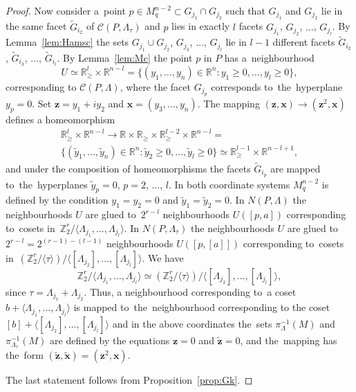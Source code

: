\documentclass[12pt]{amsart}
\theoremstyle{definition}
\theoremstyle{remark}
\begin{document}
\begin{proof}
Now consider a~point  $p\in M_q^{n-2}\subset G_{j_1}\cap G_{j_2}$ such that $G_{j_1}$ and $G_{j_2}$
lie in the same facet $\widetilde{G}_{i_2}$  of $\mathcal{C}(P,\Lambda_\tau)$ and $p$ lies in exactly 
$l$ facets $G_{j_1}$, $G_{j_2}$, $\dots$, $G_{j_l}$. By Lemma~\ref{lem:Hamsc} the sets $G_{j_1}\cup G_{j_2}$,
$G_{j_3}$, $\dots$, $G_{j_l}$ lie in $l-1$ different facets $\widetilde{G}_{i_2}$, $\widetilde{G}_{i_3}$, 
$\dots$, $\widetilde{G}_{i_l}$. By Lemma~\ref{lem:Mc} the point $p$ in $P$ has a~neighbourhood 
$$
U\simeq\mathbb R^l_{\geqslant }\times\mathbb R^{n-l}=\{(y_1,\dots,y_n)\in\mathbb R^n\colon y_1\geqslant 0,\dots,y_l\geqslant 0\},
$$ 
corresponding to $\mathcal{C}(P,\Lambda)$, where the facet $G_{j_p}$
corresponds to~the~hyperplane $y_p=0$. Set $\boldsymbol{z}=y_1+i y_2$ and
$\boldsymbol{x}=(y_3,\dots, y_n)$. The mapping $(\boldsymbol{z}, \boldsymbol{x})\to (\boldsymbol{z}^2, \boldsymbol{x})$
defines a homeomorphism 
\begin{gather*}
\mathbb R^l_{\geqslant }\times\mathbb R^{n-l}\to\mathbb R\times \mathbb R_{\geqslant}\times 
\mathbb R^{l-2}_{\geqslant}\times\mathbb R^{n-l}=\\
\{(\widetilde{y}_1,\dots,\widetilde{y}_n)
\in\mathbb R^n\colon \widetilde{y}_2\geqslant 0,\dots,\widetilde{y}_l\geqslant 0\}
\simeq \mathbb R^{l-1}_{\geqslant}\times\mathbb R^{n-l+1},
\end{gather*}
and under the composition of homeomorphisms the facets $\widetilde{G}_{i_p}$ are mapped \linebreak to~the~hyperplanes
$\widetilde{y}_p=0$, $p=2$, $\dots$, $l$. In both coordinate systems $M_q^{n-2}$ is defined by the condition  
$y_1=y_2=0$ and  $\widetilde{y}_1=\widetilde{y}_2=0$.
In $N(P,\Lambda)$ the neighbourhoods $U$ are glued to~$2^{r-l}$ neighbourhoods $U([p,a])$ corresponding 
to~cosets in~$\mathbb Z_2^r/\langle \Lambda_{j_1},\dots,\Lambda_{j_l}\rangle$. 
In $N(P,\Lambda_\tau)$ the neighbourhoods $U$  are glued to~$2^{r-l}=2^{(r-1)-(l-1)}$ neighbourhoods $U([p,[a]])$ 
corresponding to~cosets in~$(\mathbb Z_2^r/\langle\tau\rangle)/\langle [\Lambda_{j_2}],\dots,[\Lambda_{j_l}]\rangle$.
We have 
$$
\mathbb Z_2^r/\langle \Lambda_{j_1},\dots,\Lambda_{j_l}\rangle\simeq 
(\mathbb Z_2^r/\langle\tau\rangle)/\langle [\Lambda_{j_2}],\dots,[\Lambda_{j_l}]\rangle,
$$
since $\tau=\Lambda_{j_1}+\Lambda_{j_2}$.
Thus, a neighbourhood corresponding to~a coset $b+\langle \Lambda_{j_1},\dots,\Lambda_{j_l}\rangle$ 
is mapped to~the~neighbourhood corresponding to the coset 
$[b]+\langle [\Lambda_{j_2}],\dots,[\Lambda_{j_l}]\rangle$ and in the above coordinates the~sets
$\pi_{\Lambda}^{-1}(M)$ and $\pi_{\Lambda_\tau}^{-1}(M)$ are defined by the equations
$\boldsymbol{z}=0$ and $\widetilde{\boldsymbol{z}}=0$, and the~mapping has the~form 
$(\widetilde{\boldsymbol{z}}, \widetilde{\boldsymbol{x}})=(\boldsymbol{z}^2, \boldsymbol{x})$.  

The last statement follows from Proposition~\ref{prop:Gk}. 
\end{proof}
\end{document}

